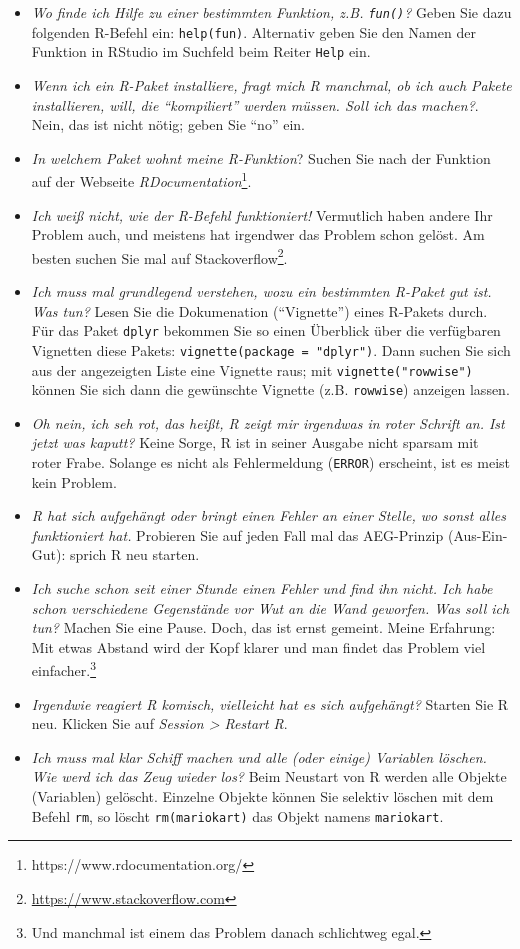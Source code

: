 \documentclass[
  letterpaper,
  DIV=11,
  numbers=noendperiod]{scrartcl}
\providecommand{\tightlist}{%
  \setlength{\itemsep}{0pt}\setlength{\parskip}{0pt}}\usepackage{longtable,booktabs,array}
\theoremstyle{definition}
\theoremstyle{definition}
\theoremstyle{definition}
\theoremstyle{remark}
\begin{document}
\begin{itemize}
\tightlist
\item
  \emph{Wo finde ich Hilfe zu einer bestimmten Funktion, z.B.
  \texttt{fun()}?} Geben Sie dazu folgenden R-Befehl ein:
  \texttt{help(fun)}. Alternativ geben Sie den Namen der Funktion in
  RStudio im Suchfeld beim Reiter \texttt{Help} ein.
\item
  \emph{Wenn ich ein R-Paket installiere, fragt mich R manchmal, ob ich
  auch Pakete installieren, will, die ``kompiliert'' werden müssen. Soll
  ich das machen?}. Nein, das ist nicht nötig; geben Sie ``no'' ein.
\item
  \emph{In welchem Paket wohnt meine R-Funktion}? Suchen Sie nach der
  Funktion auf der Webseite \emph{RDocumentation}\footnote{https://www.rdocumentation.org/}.
\item
  \emph{Ich weiß nicht, wie der R-Befehl funktioniert!} Vermutlich haben
  andere Ihr Problem auch, und meistens hat irgendwer das Problem schon
  gelöst. Am besten suchen Sie mal auf Stackoverflow\footnote{\url{https://www.stackoverflow.com}}.
\item
  \emph{Ich muss mal grundlegend verstehen, wozu ein bestimmten R-Paket
  gut ist. Was tun?} Lesen Sie die Dokumenation (``Vignette'') eines
  R-Pakets durch. Für das Paket \texttt{dplyr} bekommen Sie so einen
  Überblick über die verfügbaren Vignetten diese Pakets:
  \texttt{vignette(package\ =\ "dplyr")}. Dann suchen Sie sich aus der
  angezeigten Liste eine Vignette raus; mit \texttt{vignette("rowwise")}
  können Sie sich dann die gewünschte Vignette (z.B. \texttt{rowwise})
  anzeigen lassen.
\item
  \emph{Oh nein, ich seh rot, das heißt, R zeigt mir irgendwas in roter
  Schrift an. Ist jetzt was kaputt?} Keine Sorge, R ist in seiner
  Ausgabe nicht sparsam mit roter Frabe. Solange es nicht als
  Fehlermeldung (\texttt{ERROR}) erscheint, ist es meist kein Problem.
\item
  \emph{R hat sich aufgehängt oder bringt einen Fehler an einer Stelle,
  wo sonst alles funktioniert hat.} Probieren Sie auf jeden Fall mal das
  AEG-Prinzip (Aus-Ein-Gut): sprich R neu starten.
\item
  \emph{Ich suche schon seit einer Stunde einen Fehler und find ihn
  nicht. Ich habe schon verschiedene Gegenstände vor Wut an die Wand
  geworfen. Was soll ich tun?} Machen Sie eine Pause. Doch, das ist
  ernst gemeint. Meine Erfahrung: Mit etwas Abstand wird der Kopf klarer
  und man findet das Problem viel einfacher.\footnote{Und manchmal ist
    einem das Problem danach schlichtweg egal.}
\item
  \emph{Irgendwie reagiert R komisch, vielleicht hat es sich
  aufgehängt?} Starten Sie R neu. Klicken Sie auf \emph{Session
  \textgreater{} Restart R}.
\item
  \emph{Ich muss mal klar Schiff machen und alle (oder einige) Variablen
  löschen. Wie werd ich das Zeug wieder los?} Beim Neustart von R werden
  alle Objekte (Variablen) gelöscht. Einzelne Objekte können Sie
  selektiv löschen mit dem Befehl \texttt{rm}, so löscht
  \texttt{rm(mariokart)} das Objekt namens \texttt{mariokart}.
\end{itemize}
\end{document}
